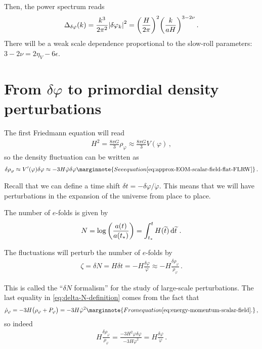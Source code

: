 \documentclass[main.tex]{subfiles}
\begin{document}
Then, the power spectrum reads 
%
\begin{align} \label{eq:scalar-field-power-spectrum}
\Delta_{ \delta \varphi }(k) = \frac{k^3}{2 \pi^2} \abs{ \delta \varphi _k}^2 = \qty( \frac{H}{2 \pi })^2 \qty( \frac{k}{aH})^{3-2\nu }
\,.
\end{align}
%
There will be a weak scale dependence proportional to the slow-roll parameters: \(3 - 2 \nu = 2 \eta _V - 6 \epsilon \).

\section{From \(\delta \varphi \) to primordial density perturbations}

The first Friedmann equation will read 
%
\begin{align}
H^2 = \frac{8 \pi G}{3} \rho_\varphi  \approx \frac{8 \pi G}{3} V(\varphi )
\,,
\end{align}
%
so the density fluctuation can be written as 
%
\begin{align}
\delta \rho _\varphi \approx V' (\varphi ) \delta \varphi \approx - 3 H \dot{\varphi} \delta \varphi 
\marginnote{See equation \eqref{eq:approx-EOM-scalar-field-flat-FLRW}}
\,.
\end{align}

Recall that we can define a time shift \(\delta t = - \delta \varphi / \dot{\varphi} \).
This means that we will have perturbations in the expansion of the universe from place to place.

The number of \(e\)-folds is given by 
%
\begin{align}
N = \log \qty( \frac{a(t)}{a (t_*)}) = \int_{t_*}^{t} H(\widetilde{t}) \dd{\widetilde{t}}
\,.
\end{align}

The fluctuations will perturb the number of \(e\)-folds by 
%
\begin{align} \label{eq:delta-N-definition}
\zeta = 
\delta N = H \delta t = - H \frac{ \delta \varphi }{\dot{\varphi}} \approx - H \frac{ \delta \rho _\varphi }{ \dot{\rho}_\varphi }
\,.
\end{align}

This is called the ``\(\delta N\) formalism'' for the study of large-scale perturbations.
The last equality in \eqref{eq:delta-N-definition} comes from the fact that 
%
\begin{align}
\dot{\rho}_\varphi = - 3H \qty(\rho _\varphi + P_\varphi ) = - 3 H \dot{\varphi}^2
\marginnote{From equation \eqref{eq:energy-momentum-scalar-field}.}
\,,
\end{align}
%
so indeed 
%
\begin{align}
H \frac{ \delta \rho _\varphi }{\dot{\rho}_\varphi } = \frac{- 3 H^2 \varphi  \delta \varphi }{-3 H \dot{\varphi}^2} = H \frac{ \delta \varphi }{\dot{\varphi}}
\,.
\end{align}
\end{document}
